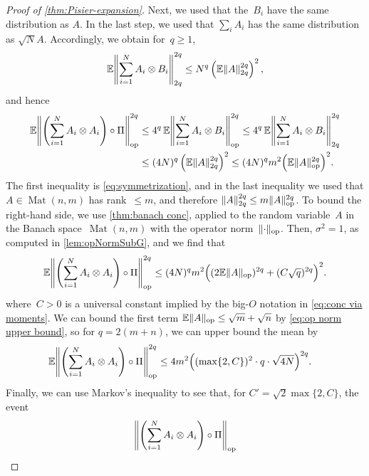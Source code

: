 \documentclass[aos]{imsart}
\theoremstyle{definition}
\numberwithin{equation}{section}
\DeclareMathOperator{\op}{op}
\DeclareMathOperator{\Mat}{Mat}
\DeclarePairedDelimiter{\norm}{\lVert}{\rVert}
\newcommand{\ot}{\otimes}
\newcommand{\E}{\mathbb{E}}
\newcommand{\MW}[1]{{\color{red}[MW: #1]}}
\newcommand{\MW}[1]{{}}
\begin{document}
\begin{appendix}
\begin{proof} [Proof of \cref{thm:Pisier-expansion}]
Next, we used that the~$B_i$ have the same distribution as $A$.
In the last step, we used that $\sum_i A_i$ has the same distribution as $\sqrt N A$.
Accordingly, we obtain for~$q\geq1$,
\begin{align*}
  \E \norm*{\sum_{i=1}^N A_i \ot B_i}_{2q}^{2q}
\leq N^q \left( \E\norm{A}_{2q}^{2q} \right)^2,
\end{align*}
and hence
\begin{align*}
\E \norm*{\left( \sum_{i=1}^N A_i \otimes A_i \right) \circ \Pi}_{\op}^{2q}
&\leq 4^q \, \E \norm*{\sum_{i=1}^N A_i \ot B_i}_{\op}^{2q}
\leq 4^q \, \E \norm*{\sum_{i=1}^N A_i \ot B_i}_{2q}^{2q} \\
&\leq (4N)^q \left( \E\norm{A}_{2q}^{2q} \right)^2
\leq (4N)^q m^2 \Bigl( \E\norm{A}_{\op}^{2q} \Bigr)^2.
\end{align*}
The first inequality is \cref{eq:symmetrization}, and in the last inequality we used that $A \in \Mat(n,m)$ has rank~$\leq m$, and therefore $\norm{A}_{2q}^{2q} \leq m \norm A_{\op}^{2q}$.
To bound the right-hand side, we use \cref{thm:banach conc}, applied to the random variable~$A$ in the Banach space~$\Mat(n,m)$ with the operator norm~$\norm{\cdot}_{\op}$.
Then, $\sigma^2=1$, as computed in \cref{lem:opNormSubG}, and we find that
\begin{align*}
\E \norm*{\left( \sum_{i=1}^N A_i \otimes A_i \right) \circ \Pi}_{\op}^{2q}
\leq (4 N)^q m^2 \Bigl( (2 \E\norm A_{\op})^{2q} + (C \sqrt{q})^{2q} \Bigr)^{2}.
\end{align*}
where~$C>0$ is a universal constant implied by the big-$O$ notation in \cref{eq:conc via moments}.
We can bound the first term $\E \norm{A}_{\op} \leq \sqrt{m}+\sqrt{n}$ by \cref{eq:op norm upper bound}, so for $q = 2(m + n)$, we can upper bound the mean by
\begin{align*}
\E \norm*{\left( \sum_{i=1}^N A_i \otimes A_i \right) \circ \Pi}_{\op}^{2q}
&\leq 4 m^2 \Big( (\max\{2, C\})^{2} \cdot q \cdot \sqrt{ 4 N }\Big)^{2q} .
\end{align*}
Finally, we can use Markov's inequality to see that, for $C' = \sqrt{2} \max\{2,C\}$, the event
\begin{align}\label{eq:desired event}
  \norm*{\left(\sum_{i=1}^N A_i \otimes A_i \right) \circ \Pi}_{\op}

\end{align}
\end{proof}
\end{appendix}
\end{document}

